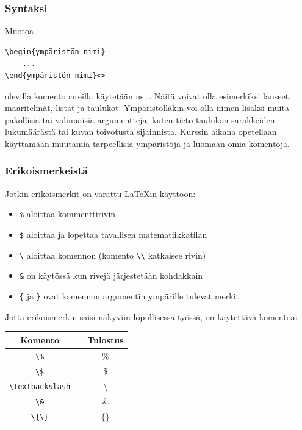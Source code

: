 \begin{frame}[fragile]
    \frametitle{Syntaksi}
    Muotoa 
    \begin{lstlisting}
\begin{ympäristön nimi}
    ...
\end{ympäristön nimi}<>
    \end{lstlisting}
    olevilla komentopareilla käytetään ns. . \pause Näitä voivat olla esimerkiksi lauseet, määritelmät, listat ja taulukot. \pause
    \vaihto Ympäristölläkin voi olla nimen lisäksi muita pakollisia tai valinnaisia argumentteja, kuten tieto taulukon sarakkeiden lukumäärästä tai kuvan toivotusta sijainnista. \pause
    \vaihto
    Kurssin aikana opetellaan käyttämään muutamia tarpeellisia ympäristöjä ja luomaan omia komentoja.
\end{frame}

\begin{frame}[fragile]
    \frametitle{Erikoismerkeistä}
    Jotkin erikoismerkit on varattu \LaTeX in käyttöön:
    \begin{itemize}[<+->]
        \item \lstinline-%- aloittaa kommenttirivin
        \item \lstinline-$- aloittaa ja lopettaa tavallisen matematiikkatilan
        \item \lstinline-\- aloittaa komennon (komento \lstinline-\\- katkaisee rivin)
        \item \lstinline-&- on käytössä kun rivejä järjestetään kohdakkain
        \item \lstinline-{- ja \lstinline-}- ovat komennon argumentin ympärille tulevat merkit
    \end{itemize}\pause
    Jotta erikoismerkin saisi näkyviin lopullisessa työssä, on käytettävä komentoa:
    \begin{table}[H]
        \begin{tabular}{ccc}
            Komento & & Tulostus\\
            \hline
            \verb-\%- & & \%\\
            \verb-\$- & & \$\\
            \verb-\textbackslash- & & \textbackslash\\
            \verb-\&- & & \&\\
            \verb-\{\}- & & \{\}
        \end{tabular}
    \end{table}
\end{frame}

